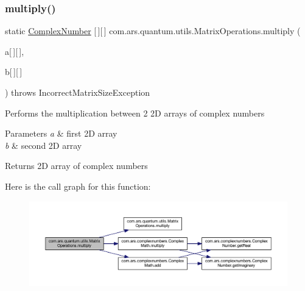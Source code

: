 \subsubsection{\texorpdfstring{multiply()}{multiply()}\hspace{0.1cm}{\footnotesize\ttfamily [2/2]}}
{\footnotesize\ttfamily static \hyperlink{classcom_1_1ars_1_1complexnumbers_1_1_complex_number}{Complex\+Number} \mbox{[}$\,$\mbox{]}\mbox{[}$\,$\mbox{]} com.\+ars.\+quantum.\+utils.\+Matrix\+Operations.\+multiply (\begin{DoxyParamCaption}\item[{\hyperlink{classcom_1_1ars_1_1complexnumbers_1_1_complex_number}{Complex\+Number}}]{a\mbox{[}$\,$\mbox{]}\mbox{[}$\,$\mbox{]},  }\item[{\hyperlink{classcom_1_1ars_1_1complexnumbers_1_1_complex_number}{Complex\+Number}}]{b\mbox{[}$\,$\mbox{]}\mbox{[}$\,$\mbox{]} }\end{DoxyParamCaption}) throws Incorrect\+Matrix\+Size\+Exception\hspace{0.3cm}{\ttfamily [static]}}

Performs the multiplication between 2 2D arrays of complex numbers


\begin{DoxyParams}{Parameters}
{\em a} & first 2D array \\
\hline
{\em b} & second 2D array \\
\hline
\end{DoxyParams}
\begin{DoxyReturn}{Returns}
2D array of complex numbers 
\end{DoxyReturn}
Here is the call graph for this function\+:
\nopagebreak
\begin{figure}[H]
\begin{center}
\leavevmode
\includegraphics[width=350pt]{classcom_1_1ars_1_1quantum_1_1utils_1_1_matrix_operations_ae7c98406e2a3c1d35d78538d82bd637d_cgraph}
\end{center}
\end{figure}
\hypertarget{classcom_1_1ars_1_1quantum_1_1utils_1_1_matrix_operations_ac7566a690e0c87a72548e69ea09c0158}{}\label{classcom_1_1ars_1_1quantum_1_1utils_1_1_matrix_operations_ac7566a690e0c87a72548e69ea09c0158} 
